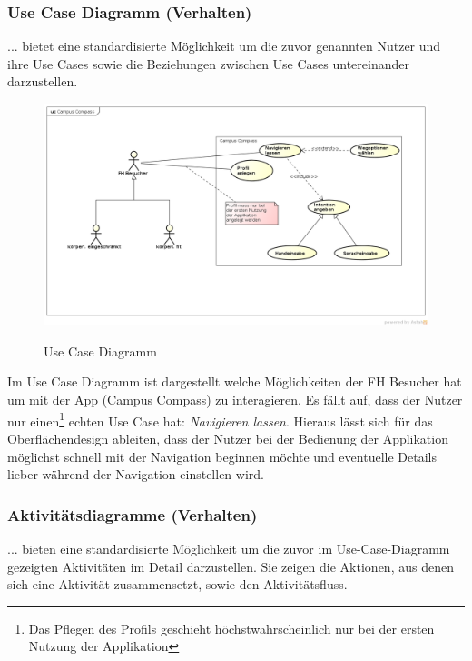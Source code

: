 \subsubsection*{Use Case Diagramm (Verhalten)}
... bietet eine standardisierte Möglichkeit um die zuvor genannten Nutzer und ihre Use Cases sowie die Beziehungen zwischen Use Cases untereinander darzustellen.

\begin{figure}[hbt]
  \centering
  \includegraphics[width=\linewidth]{img/use-case-diagram.png}
  \label{img:use-case-diagramm}
  \caption{Use Case Diagramm}
\end{figure}

\noindent Im Use Case Diagramm ist dargestellt welche Möglichkeiten der FH Besucher hat um mit der App (Campus Compass) zu interagieren. Es fällt auf, dass der Nutzer nur einen\footnote{Das Pflegen des Profils geschieht höchstwahrscheinlich nur bei der ersten Nutzung der Applikation} echten Use Case hat: \emph{Navigieren lassen}. Hieraus lässt sich für das Oberflächendesign ableiten, dass der Nutzer bei der Bedienung der Applikation möglichst schnell mit der Navigation beginnen möchte und eventuelle Details lieber während der Navigation einstellen wird. 

\subsubsection*{Aktivitätsdiagramme (Verhalten)}
... bieten eine standardisierte Möglichkeit um die zuvor im Use-Case-Diagramm gezeigten Aktivitäten im Detail darzustellen. Sie zeigen die Aktionen, aus denen sich eine Aktivität zusammensetzt, sowie den Aktivitätsfluss.

